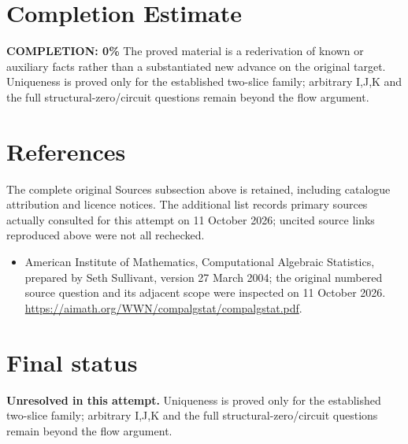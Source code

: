 \documentclass[11pt]{article}
\begin{document}
\section{Completion Estimate}
\noindent\textbf{COMPLETION: 0\%}
The proved material is a rederivation of known or auxiliary facts rather than a substantiated new advance on the original target. Uniqueness is proved only for the established two-slice family; arbitrary I,J,K and the full structural-zero/circuit questions remain beyond the flow argument.
\section{References}
The complete original Sources subsection above is retained, including catalogue attribution and licence notices. The additional list records primary sources actually consulted for this attempt on 11 October 2026; uncited source links reproduced above were not all rechecked.
\begin{itemize}
\item American Institute of Mathematics, Computational Algebraic Statistics, prepared by Seth Sullivant, version 27 March 2004; the original numbered source question and its adjacent scope were inspected on 11 October 2026. \url{https://aimath.org/WWN/compalgstat/compalgstat.pdf}.
\end{itemize}
\section{Final status}
\textbf{Unresolved in this attempt.} Uniqueness is proved only for the established two-slice family; arbitrary I,J,K and the full structural-zero/circuit questions remain beyond the flow argument.
\end{document}
